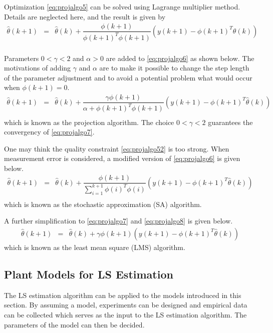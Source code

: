 Optimization \eqref{eq:projalgo5} can be solved using Lagrange multiplier method. Details are neglected here, and the result is given by
\begin{eqnarray}
  \hat{\theta}(k+1) &=& \hat{\theta}(k) + \dfrac{\phi(k+1)}{\phi(k+1)^T\phi(k+1)}\left(y(k+1) - \phi(k+1)^T\hat{\theta}(k)\right) \nonumber \\ && \label{eq:projalgo6}
\end{eqnarray}

Parameters $0 < \gamma < 2$ and $\alpha > 0$ are added to \eqref{eq:projalgo6} as shown below. The motivations of adding $\gamma$ and $\alpha$ are to make it possible to change the step length of the parameter adjustment and to avoid a potential problem what would occur when $\phi(k+1)=0$.
\begin{eqnarray}
  \hat{\theta}(k+1) &=& \hat{\theta}(k) + \dfrac{\gamma\phi(k+1)}{\alpha + \phi(k+1)^T\phi(k+1)}\left(y(k+1) - \phi(k+1)^T\hat{\theta}(k)\right) \nonumber \\ && \label{eq:projalgo7}
\end{eqnarray}
which is known as the projection algorithm. The choice $0 < \gamma < 2$ guarantees the convergency of \eqref{eq:projalgo7}.

One may think the quality constraint \eqref{eq:projalgo52} is too strong. When measurement error is considered, a modified version of \eqref{eq:projalgo6} is given below.
\begin{eqnarray}
\hat{\theta}(k+1) &=& \hat{\theta}(k) + \dfrac{\phi(k+1)}{\sum_{i=1}^{k+1}\phi(i)^T\phi(i)}\left(y(k+1) - \phi(k+1)^T\hat{\theta}(k)\right) \nonumber \\ && \label{eq:projalgo8}
\end{eqnarray}
which is known as the stochastic approximation (SA) algorithm.

A further simplification to \eqref{eq:projalgo7} and \eqref{eq:projalgo8} is given below.
\begin{eqnarray}
\hat{\theta}(k+1) &=& \hat{\theta}(k) + \gamma\phi(k+1)\left(y(k+1) - \phi(k+1)^T\hat{\theta}(k)\right) \nonumber
\end{eqnarray}
which is known as the least mean square (LMS) algorithm.

\subsection{Plant Models for LS Estimation}

The LS estimation algorithm can be applied to the models introduced in this section. By assuming a model, experiments can be designed and empirical data can be collected which serves as the input to the LS estimation algorithm. The parameters of the model can then be decided.


